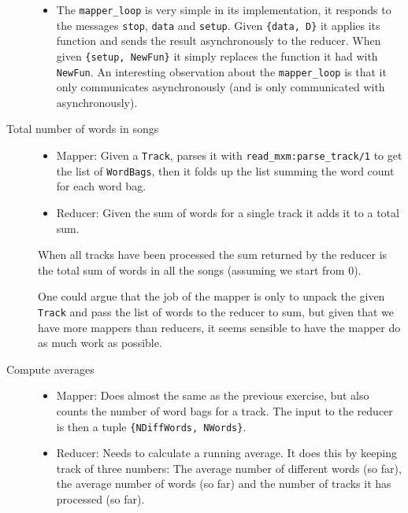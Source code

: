 \documentclass[a4paper]{article}
\begin{document}
\begin{description}
\begin{itemize}
   \item The \texttt{mapper\_loop} is very simple in its implementation, it responds to the messages \texttt{stop}, \texttt{data} and \texttt{setup}. Given \texttt{\{data, D\}} it applies its function and sends the result asynchronously to the reducer. When given \texttt{\{setup, NewFun\}} it simply replaces the function it had with \texttt{NewFun}. An interesting observation about the \texttt{mapper\_loop} is that it only communicates asynchronously (and is only communicated with asynchronously).
  \end{itemize}
\item[Total number of words in songs]\hfill
  \begin{itemize}
  \item Mapper: Given a \texttt{Track}, parses it with \texttt{read\_mxm:parse\_track/1} to get the list of \texttt{WordBags}, then it folds up the list summing the word count for each word bag.
  \item Reducer: Given the sum of words for a single track it adds it to a total sum.
  \end{itemize}
  When all tracks have been processed the sum returned by the reducer is the total sum of words in all the songs (assuming we start from $0$).

  One could argue that the job of the mapper is only to unpack the given \texttt{Track} and pass the list of words to the reducer to sum, but given that we have more mappers than reducers, it seems sensible to have the mapper do as much work as possible.
\item[Compute averages]\hfill
  \begin{itemize}
  \item Mapper: Does almost the same as the previous exercise, but also counts the number of word bags for a track. The input to the reducer is then a tuple \texttt{\{NDiffWords, NWords\}}.
  \item Reducer: Needs to calculate a running average. It does this by keeping track of three numbers: The average number of different words (so far), the average number of words (so far) and the number of tracks it has processed (so far).


\end{itemize}
\end{description}
\end{document}
